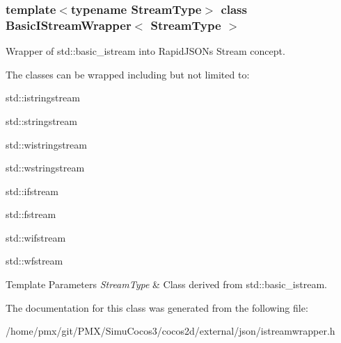 \subsubsection*{template$<$typename Stream\+Type$>$\newline
class Basic\+I\+Stream\+Wrapper$<$ Stream\+Type $>$}

Wrapper of {\ttfamily std\+::basic\+\_\+istream} into Rapid\+J\+S\+ON\textquotesingle{}s Stream concept. 

The classes can be wrapped including but not limited to\+:


\begin{DoxyItemize}
\item {\ttfamily std\+::istringstream} 
\item {\ttfamily std\+::stringstream} 
\item {\ttfamily std\+::wistringstream} 
\item {\ttfamily std\+::wstringstream} 
\item {\ttfamily std\+::ifstream} 
\item {\ttfamily std\+::fstream} 
\item {\ttfamily std\+::wifstream} 
\item {\ttfamily std\+::wfstream} 
\end{DoxyItemize}


\begin{DoxyTemplParams}{Template Parameters}
{\em Stream\+Type} & Class derived from {\ttfamily std\+::basic\+\_\+istream}. \\
\hline
\end{DoxyTemplParams}


The documentation for this class was generated from the following file\+:\begin{DoxyCompactItemize}
\item 
/home/pmx/git/\+P\+M\+X/\+Simu\+Cocos3/cocos2d/external/json/istreamwrapper.\+h\end{DoxyCompactItemize}

